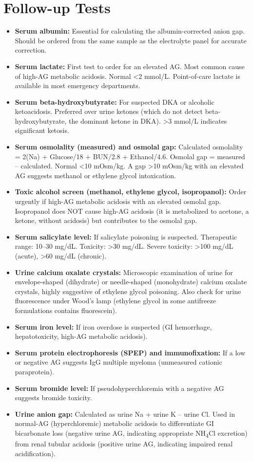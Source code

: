 \section*{Follow-up Tests}
\begin{itemize}
  \item \textbf{Serum albumin:} Essential for calculating the albumin-corrected anion gap. Should be ordered from the same sample as the electrolyte panel for accurate correction.
  \item \textbf{Serum lactate:} First test to order for an elevated AG. Most common cause of high-AG metabolic acidosis. Normal <2 mmol/L. Point-of-care lactate is available in most emergency departments.
  \item \textbf{Serum beta-hydroxybutyrate:} For suspected DKA or alcoholic ketoacidosis. Preferred over urine ketones (which do not detect beta-hydroxybutyrate, the dominant ketone in DKA). >3 mmol/L indicates significant ketosis.
  \item \textbf{Serum osmolality (measured) and osmolal gap:} Calculated osmolality = 2(Na) + Glucose/18 + BUN/2.8 + Ethanol/4.6. Osmolal gap = measured -- calculated. Normal <10 mOsm/kg. A gap >10 mOsm/kg with an elevated AG suggests methanol or ethylene glycol intoxication.
  \item \textbf{Toxic alcohol screen (methanol, ethylene glycol, isopropanol):} Order urgently if high-AG metabolic acidosis with an elevated osmolal gap. Isopropanol does NOT cause high-AG acidosis (it is metabolized to acetone, a ketone, without acidosis) but contributes to the osmolal gap.
  \item \textbf{Serum salicylate level:} If salicylate poisoning is suspected. Therapeutic range: 10--30 mg/dL. Toxicity: >30 mg/dL. Severe toxicity: >100 mg/dL (acute), >60 mg/dL (chronic).
  \item \textbf{Urine calcium oxalate crystals:} Microscopic examination of urine for envelope-shaped (dihydrate) or needle-shaped (monohydrate) calcium oxalate crystals, highly suggestive of ethylene glycol poisoning. Also check for urine fluorescence under Wood's lamp (ethylene glycol in some antifreeze formulations contains fluorescein).
  \item \textbf{Serum iron level:} If iron overdose is suspected (GI hemorrhage, hepatotoxicity, high-AG metabolic acidosis).
  \item \textbf{Serum protein electrophoresis (SPEP) and immunofixation:} If a low or negative AG suggests IgG multiple myeloma (unmeasured cationic paraprotein).
  \item \textbf{Serum bromide level:} If pseudohyperchloremia with a negative AG suggests bromide toxicity.
  \item \textbf{Urine anion gap:} Calculated as urine Na + urine K -- urine Cl. Used in normal-AG (hyperchloremic) metabolic acidosis to differentiate GI bicarbonate loss (negative urine AG, indicating appropriate NH\textsubscript{4}Cl excretion) from renal tubular acidosis (positive urine AG, indicating impaired renal acidification).
\end{itemize}

